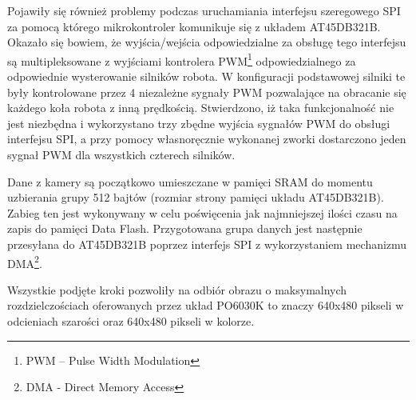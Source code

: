 Pojawiły się również problemy podczas uruchamiania interfejsu szeregowego SPI za
pomocą którego mikrokontroler komunikuje się z układem AT45DB321B. Okazało się
bowiem, że wyjścia/wejścia odpowiedzialne za obsługę tego interfejsu są
multipleksowane z wyjściami kontrolera PWM\footnote{PWM -- Pulse Width
Modulation} odpowiedzialnego za odpowiednie wysterowanie silników robota. W
konfiguracji podstawowej silniki te były kontrolowane przez 4 niezależne sygnały
PWM pozwalające na obracanie się każdego koła robota z inną prędkością.
Stwierdzono, iż taka funkcjonalność nie jest niezbędna i wykorzystano trzy zbędne
wyjścia sygnałów PWM do obsługi interfejsu SPI, a przy pomocy własnoręcznie
wykonanej zworki dostarczono jeden sygnał PWM dla wszystkich czterech silników.

Dane z kamery są początkowo umieszczane w pamięci SRAM do momentu uzbierania
grupy 512 bajtów (rozmiar strony pamięci układu AT45DB321B). Zabieg ten jest
wykonywany w celu poświęcenia jak najmniejszej ilości czasu na zapis do pamięci
Data Flash. Przygotowana grupa danych jest następnie przesyłana do AT45DB321B
poprzez interfejs SPI z wykorzystaniem mechanizmu DMA\footnote{DMA - Direct
Memory Access}.

Wszystkie podjęte kroki pozwoliły na odbiór obrazu o maksymalnych
rozdzielczościach oferowanych przez układ PO6030K to znaczy 640x480 pikseli w
odcieniach szarości oraz 640x480 pikseli w kolorze.